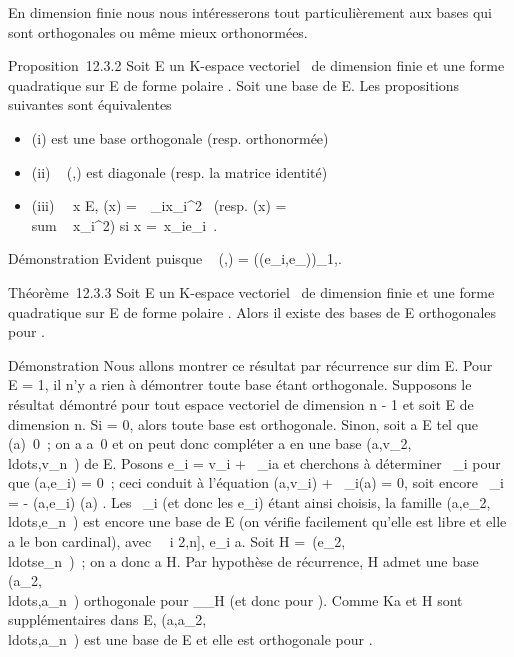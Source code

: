 \documentclass[]{article}
\begin{document}
En dimension finie nous nous intéresserons tout particulièrement aux
bases qui sont orthogonales ou même mieux orthonormées.

Proposition~12.3.2 Soit E un K-espace vectoriel ~de dimension finie et \Phi
une forme quadratique sur E de forme polaire \phi. Soit  une base de E.
Les propositions suivantes sont équivalentes

\begin{itemize}
\itemsep1pt\parskip0pt
\item
  (i)  est une base orthogonale (resp. orthonormée)
\item
  (ii) \mathrmMat~ (\phi,) est
  diagonale (resp. la matrice identité)
\item
  (iii) \forall~~x \in E, \Phi(x) =\
  \sum  \alpha~\_ix\_i^2~
  (resp. \Phi(x) = \\sum ~
  x\_i^2) si x =\
  \sum  x\_ie\_i~.
\end{itemize}

Démonstration Evident puisque
\mathrmMat~ (\phi,) =
(\phi(e\_i,e\_\jmath))\_1\leqi,\jmath\leqn.

Théorème~12.3.3 Soit E un K-espace vectoriel ~de dimension finie et \Phi
une forme quadratique sur E de forme polaire \phi. Alors il existe des
bases de E orthogonales pour \phi.

Démonstration Nous allons montrer ce résultat par récurrence sur
dim E. Pour \dim~ E =
1, il n'y a rien à démontrer toute base étant orthogonale. Supposons le
résultat démontré pour tout espace vectoriel de dimension n - 1 et soit
E de dimension n. Si \Phi = 0, alors toute base est orthogonale. Sinon,
soit a \in E tel que \Phi(a)\neq~0~; on a
a\neq~0 et on peut donc compléter a en une base
(a,v\_2,\\ldots,v\_n~)
de E. Posons e\_i = v\_i + \lambda~\_ia et cherchons à
déterminer \lambda~\_i pour que \phi(a,e\_i) = 0~; ceci conduit à
l'équation \phi(a,v\_i) + \lambda~\_i\Phi(a) = 0, soit encore
\lambda~\_i = - \phi(a,e\_i) \over \Phi(a) . Les
\lambda~\_i (et donc les e\_i) étant ainsi choisis, la famille
(a,e\_2,\\ldots,e\_n~)
est encore une base de E (on vérifie facilement qu'elle est libre et
elle a le bon cardinal), avec \forall~~i \in {[}2,n{]},
e\_i \bot a. Soit H =\
\mathrmVect(e\_2,\\ldotse\_n~)~;
on a donc a \bot H. Par hypothèse de récurrence, H admet une base
(a\_2,\\ldots,a\_n~)
orthogonale pour \Phi\_\textbar{}\_H (et donc pour \Phi).
Comme Ka et H sont supplémentaires dans E,
(a,a\_2,\\ldots,a\_n~)
est une base de E et elle est orthogonale pour \phi.
\end{document}
